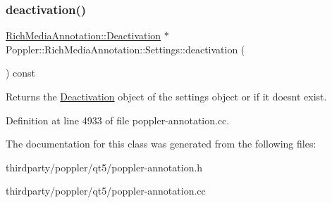 \subsubsection{\texorpdfstring{deactivation()}{deactivation()}}
{\footnotesize\ttfamily \hyperlink{class_poppler_1_1_rich_media_annotation_1_1_deactivation}{Rich\+Media\+Annotation\+::\+Deactivation} $\ast$ Poppler\+::\+Rich\+Media\+Annotation\+::\+Settings\+::deactivation (\begin{DoxyParamCaption}{ }\end{DoxyParamCaption}) const}

Returns the \hyperlink{class_poppler_1_1_rich_media_annotation_1_1_deactivation}{Deactivation} object of the settings object or {} if it doesn\textquotesingle{}t exist. 

Definition at line 4933 of file poppler-\/annotation.\+cc.



The documentation for this class was generated from the following files\+:\begin{DoxyCompactItemize}
\item 
thirdparty/poppler/qt5/poppler-\/annotation.\+h\item 
thirdparty/poppler/qt5/poppler-\/annotation.\+cc\end{DoxyCompactItemize}
